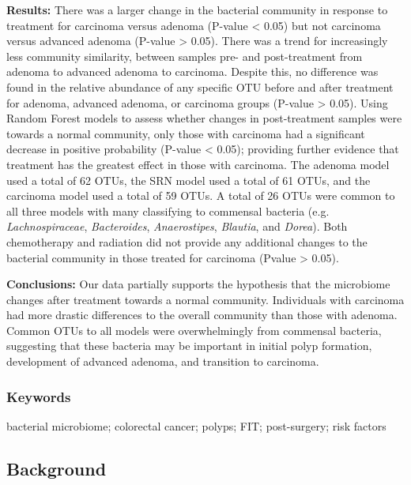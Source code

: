 \documentclass[12pt,]{article}
\begin{document}
\textbf{Results:} There was a larger change in the bacterial community
in response to treatment for carcinoma versus adenoma (P-value
\textless{} 0.05) but not carcinoma versus advanced adenoma (P-value
\textgreater{} 0.05). There was a trend for increasingly less community
similarity, between samples pre- and post-treatment from adenoma to
advanced adenoma to carcinoma. Despite this, no difference was found in
the relative abundance of any specific OTU before and after treatment
for adenoma, advanced adenoma, or carcinoma groups (P-value
\textgreater{} 0.05). Using Random Forest models to assess whether
changes in post-treatment samples were towards a normal community, only
those with carcinoma had a significant decrease in positive probability
(P-value \textless{} 0.05); providing further evidence that treatment
has the greatest effect in those with carcinoma. The adenoma model used
a total of 62 OTUs, the SRN model used a total of 61 OTUs, and the
carcinoma model used a total of 59 OTUs. A total of 26 OTUs were common
to all three models with many classifying to commensal bacteria (e.g.
\emph{Lachnospiraceae}, \emph{Bacteroides}, \emph{Anaerostipes},
\emph{Blautia}, and \emph{Dorea}). Both chemotherapy and radiation did
not provide any additional changes to the bacterial community in those
treated for carcinoma (Pvalue \textgreater{} 0.05).

\textbf{Conclusions:} Our data partially supports the hypothesis that
the microbiome changes after treatment towards a normal community.
Individuals with carcinoma had more drastic differences to the overall
community than those with adenoma. Common OTUs to all models were
overwhelmingly from commensal bacteria, suggesting that these bacteria
may be important in initial polyp formation, development of advanced
adenoma, and transition to carcinoma.

\newpage

\subsubsection{Keywords}\label{keywords}

bacterial microbiome; colorectal cancer; polyps; FIT; post-surgery; risk
factors

\newpage

\subsection{Background}\label{background}
\end{document}

